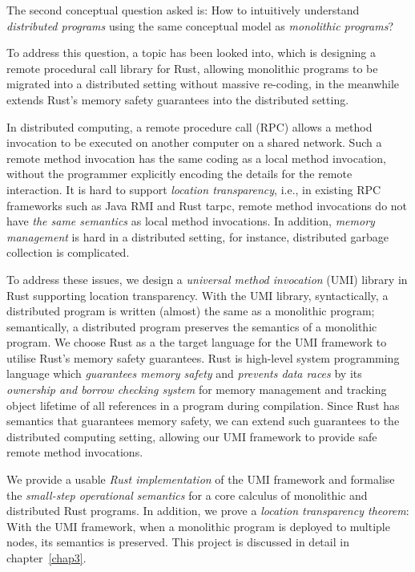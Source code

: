 The second conceptual question asked is: How to intuitively understand \emph{distributed programs} using the same conceptual model as \emph{monolithic programs}?

To address this question, a topic has been looked into, which is designing a remote procedural call library for Rust, allowing monolithic programs to be migrated into a distributed setting without massive re-coding, in the meanwhile extends Rust's memory safety guarantees into the distributed setting.

In distributed computing, a remote procedure call (RPC) allows a method invocation to be executed on another computer on a shared network. Such a remote method invocation has the same coding as a local method invocation, without the programmer explicitly encoding the details for the remote interaction. It is hard to support \emph{location transparency}, i.e., in existing RPC frameworks such as Java RMI and Rust tarpc, remote method invocations do not have \emph{the same semantics} as local method invocations. In addition, \emph{memory management} is hard in a distributed setting, for instance, distributed garbage collection is complicated.

To address these issues, we design a \emph{universal method invocation} (UMI) library in Rust supporting location transparency. With the UMI library, syntactically, a distributed program is written (almost) the same as a monolithic program; semantically, a distributed program preserves the semantics of a monolithic program. We choose Rust as a the target language for the UMI framework to utilise Rust's memory safety guarantees. Rust is high-level system programming language which \emph{guarantees memory safety} and \emph{prevents data races} by its \emph{ownership and borrow checking system} for memory management and tracking object lifetime of all references in a program during compilation. Since Rust has semantics that guarantees memory safety, we can extend such guarantees to the distributed computing setting, allowing our UMI framework to provide safe remote method invocations.

We provide a usable \emph{Rust implementation} of the UMI framework and formalise the \emph{small-step operational semantics} for a core calculus of monolithic and distributed Rust programs. In addition, we prove a \emph{location transparency theorem}: With the UMI framework, when a monolithic program is deployed to multiple nodes, its semantics is preserved.
This project is discussed in detail in chapter~\ref{chap3}.

